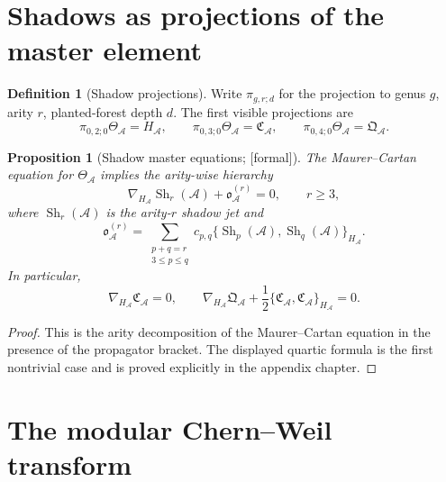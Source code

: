 \documentclass[11pt,oneside]{memoir}
\numberwithin{equation}{chapter}
\newtheorem{proposition}[theorem]{Proposition}
\theoremstyle{definition}
\newtheorem{definition}[theorem]{Definition}
\newcommand{\ClaimStatusFormal}{\textnormal{[formal]}}
\newcommand{\cA}{\mathcal A}
\newcommand{\Sh}{\operatorname{Sh}}
\begin{document}
\section{Shadows as projections of the master element}

\begin{definition}[Shadow projections]
\label{def:shadow-projections}
Write \(\pi_{g,r;d}\) for the projection to genus \(g\), arity \(r\), planted-forest depth \(d\).  The first visible projections are
\begin{equation}
\label{eq:shadow-projections}
\pi_{0,2;0}\Theta_{\cA}=H_{\cA},
\qquad
\pi_{0,3;0}\Theta_{\cA}=\mathfrak C_{\cA},
\qquad
\pi_{0,4;0}\Theta_{\cA}=\mathfrak Q_{\cA}.
\end{equation}
\end{definition}

\begin{proposition}[Shadow master equations; \ClaimStatusFormal]
\label{prop:shadow-master-eqs-formal}
The Maurer--Cartan equation for \(\Theta_{\cA}\) implies the arity-wise hierarchy
\begin{equation}
\label{eq:all-arity-shadow-eq}
\nabla_{H_{\cA}}\Sh_r(\cA)+\mathfrak o^{(r)}_{\cA}=0,
\qquad r\ge 3,
\end{equation}
where \(\Sh_r(\cA)\) is the arity-\(r\) shadow jet and
\[
\mathfrak o^{(r)}_{\cA}
=
\sum_{\substack{p+q=r \\ 3\le p\le q}}c_{p,q}\{\Sh_p(\cA),\Sh_q(\cA)\}_{H_{\cA}}.
\]
In particular,
\[
\nabla_{H_{\cA}}\mathfrak C_{\cA}=0,
\qquad
\nabla_{H_{\cA}}\mathfrak Q_{\cA}+\frac12\{\mathfrak C_{\cA},\mathfrak C_{\cA}\}_{H_{\cA}}=0.
\]
\end{proposition}

\begin{proof}
This is the arity decomposition of the Maurer--Cartan equation in the presence of the propagator bracket.  The displayed quartic formula is the first nontrivial case and is proved explicitly in the appendix chapter.
\end{proof}

\section{The modular Chern--Weil transform}
\end{document}
